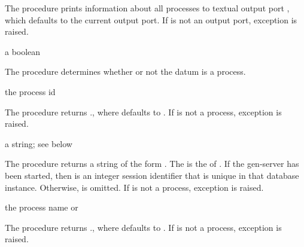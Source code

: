 The  procedure prints information about all processes to
textual output port , which defaults to the current output
port. If  is not an output port, exception  is raised.

\begin{procedure}
\end{procedure}
\returns{} a boolean

The  procedure determines whether or not the datum
 is a process.

\begin{procedure}
\end{procedure}
\returns{} the process id

The  procedure returns .,
where  defaults to . If  is not
a process, exception  is
raised.

\begin{procedure}
\end{procedure}
\returns{} a string; see below

The  procedure returns a string of the form
.
The  is the  of .
If the \hyperref[chap:log-db]{} gen-server has been started, then
 is an integer session identifier that is unique in that
database instance.
Otherwise,  is omitted.
If  is not a process, exception  is raised.

\begin{procedure}
\end{procedure}
\returns{} the process name or 

The  procedure returns .,
where  defaults to . If  is not a
process, exception  is
raised.

